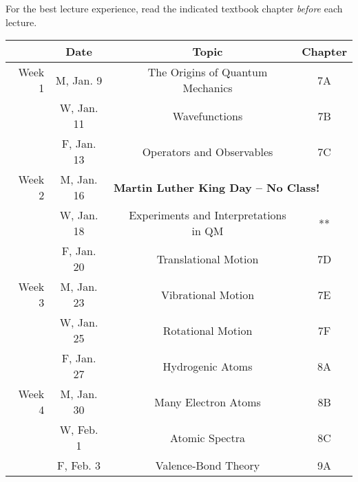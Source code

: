 \documentclass[12pt, letterpaper]{article}
\begin{document}
\noindent For the best lecture experience, read the indicated textbook chapter \emph{before} each lecture.

\begin{tabular}{rcccc}
	       & Date       &                                                                  & Topic                                 & Chapter \\
	\midrule
	Week 1 & M, Jan. 9  &                                                                  & The Origins of Quantum Mechanics      & 7A      \\
	       & W, Jan. 11 &                                                                  & Wavefunctions                         & 7B      \\
	       & F, Jan. 13 &                                                                  & Operators and Observables             & 7C      \\
	\midrule
	Week 2 & M, Jan. 16 & \multicolumn{3}{l}{\textbf{Martin Luther King Day -- No Class!}}                                                   \\
	       & W, Jan. 18 &                                                                  & Experiments and Interpretations in QM & **      \\
	       & F, Jan. 20 &                                                                  & Translational Motion                  & 7D      \\
	\midrule
	Week 3 & M, Jan. 23 &                                                                  & Vibrational Motion                    & 7E      \\
	       & W, Jan. 25 &                                                                  & Rotational Motion                     & 7F      \\
	       & F, Jan. 27 &                                                                  & Hydrogenic Atoms                      & 8A      \\
	\midrule
	Week 4 & M, Jan. 30 &                                                                  & Many Electron Atoms                   & 8B      \\
	       & W, Feb. 1  &                                                                  & Atomic Spectra                        & 8C      \\
	       & F, Feb. 3  &                                                                  & Valence-Bond Theory                   & 9A      \\
\end{tabular}
\end{document}
